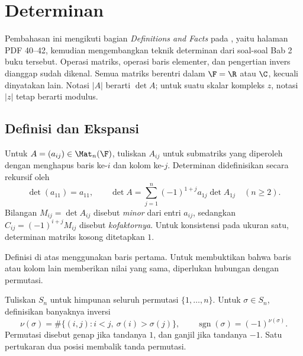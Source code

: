\chapter{Determinan}
\label{ch:determinan}

Pembahasan ini mengikuti bagian \emph{Definitions and Facts} pada
\citet[hlm.~21--23]{zhang2009}, yaitu halaman PDF 40--42, kemudian
mengembangkan teknik determinan dari soal-soal Bab 2 buku tersebut.
Operasi matriks, operasi baris elementer, dan pengertian invers dianggap
sudah dikenal. Semua matriks berentri dalam $\F=\R$ atau $\C$, kecuali
dinyatakan lain. Notasi $|A|$ berarti $\det A$; untuk suatu skalar
kompleks $z$, notasi $|z|$ tetap berarti modulus.

\section{Definisi dan Ekspansi}
\label{det:ekspansi}

\begin{defi}
      Untuk $A=(a_{ij})\in\Mat_n(\F)$, tuliskan $A_{ij}$ untuk submatriks
      yang diperoleh dengan menghapus baris ke-$i$ dan kolom ke-$j$.
      Determinan didefinisikan secara rekursif oleh
      \[
            \det(a_{11})=a_{11},\qquad
            \det A=\sum_{j=1}^n(-1)^{1+j}a_{1j}\det A_{1j}\quad(n\ge2).
      \]
      Bilangan $M_{ij}=\det A_{ij}$ disebut \emph{minor} dari entri $a_{ij}$,
      sedangkan $C_{ij}=(-1)^{i+j}M_{ij}$ disebut \emph{kofaktornya}.
      Untuk konsistensi pada ukuran satu, determinan matriks kosong ditetapkan $1$.
\end{defi}

Definisi di atas menggunakan baris pertama. Untuk membuktikan bahwa
baris atau kolom lain memberikan nilai yang sama, diperlukan hubungan
dengan permutasi.

\begin{defi}
      Tuliskan $S_n$ untuk himpunan seluruh permutasi $\{1,\ldots,n\}$.
      Untuk $\sigma\in S_n$, definisikan banyaknya inversi
      \[
            \nu(\sigma)=\#\{(i,j):i<j,\ \sigma(i)>\sigma(j)\},
            \qquad \operatorname{sgn}(\sigma)=(-1)^{\nu(\sigma)}.
      \]
      Permutasi disebut genap jika tandanya $1$, dan ganjil jika tandanya $-1$.
      Satu pertukaran dua posisi membalik tanda permutasi.
\end{defi}

